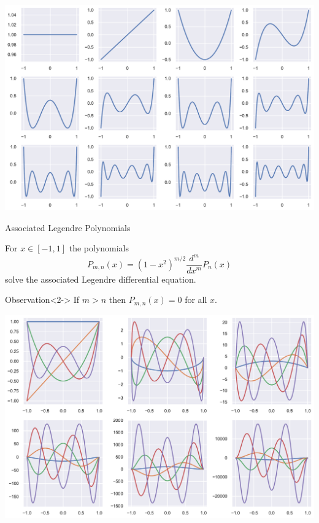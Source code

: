 \documentclass[xetex, onlymath, aspectratio=169]{beamer}
\begin{document}
\begin{frame}
	\centering
	\includegraphics[height=\paperheight]{figures/legendre-polynomials}
\end{frame}

\begin{frame}{Associated Legendre Polynomials}
	\begin{lemma}
		For \(x \in [-1, 1]\) the polynomials
		\[
  		P_{m, n} (x) = \left( 1 - x^2 \right)^{m/2} \frac{d^{m}}{dx^{m}} P_n (x)
		\]
		solve the associated Legendre differential equation.
	\end{lemma}
	
	\begin{alertblock}{Observation}<2->
		If \(m > n\) then \(P_{m, n}(x) = 0\) for all \(x\).
	\end{alertblock}
\end{frame}

\begin{frame}
	\centering
	\includegraphics[height=\paperheight]{figures/associated-legendre-polynomials}
\end{frame}
\end{document}
